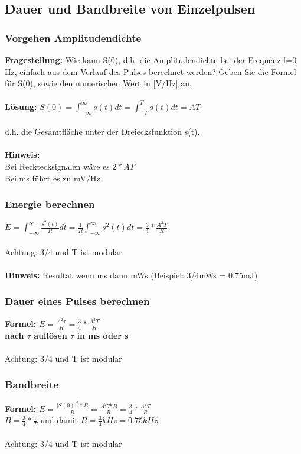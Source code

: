 \subsection{Dauer und Bandbreite von Einzelpulsen}
\subsubsection{Vorgehen Amplitudendichte}
\textbf{Fragestellung:} Wie kann S(0), d.h. die Amplitudendichte bei der Frequenz f=0 Hz, einfach aus dem Verlauf des Pulses berechnet werden? Geben Sie die Formel für S(0), sowie den numerischen Wert in [V/Hz] an.\\
\\
\textbf{Lösung:} $S(0)=\int_{-\infty }^{\infty}s(t)dt=\int_{-T}^{T}s(t)dt=AT$ \\
\\
d.h. die Gesamtfläche unter der Dreiecksfunktion s(t).\\
\\
\textbf{Hinweis:} \\
Bei Recktecksignalen wäre es $2*AT$\\
Bei ms führt es zu mV/Hz

\subsubsection{Energie berechnen}
$E=\int_{-\infty}^{\infty}\frac{s^2(t)}{R}dt=\frac{1}{R}\int_{-\infty}^{\infty}s^2(t)dt=\frac{3}{4}*\frac{A^2T}{R}$
\\ 
\\
Achtung: 3/4 und T ist modular \\
\\
\textbf{Hinweis:} Resultat wenn ms dann mWs (Beispiel: 3/4mWs = 0.75mJ)

\subsubsection{Dauer eines Pulses berechnen}
\textbf{Formel:} $E=\frac{A^2\tau}{R}=\frac{3}{4}*\frac{A^2T}{R}$ \\
\textbf{nach $\tau$ auflösen $\tau$ in ms oder s}\\
\\
Achtung: 3/4 und T ist modular

\subsubsection{Bandbreite}
\textbf{Formel:} $E=\frac{|S(0)|^2*B}{R}=\frac{A^2T^2B}{R}=\frac{3}{4}*\frac{A^2T}{R}$\\ $B=\frac{3}{4}*\frac{1}{T}$ und damit $B=\frac{3}{4}kHz=0.75kHz$\\
\\
Achtung: 3/4 und T ist modular
\clearpage

